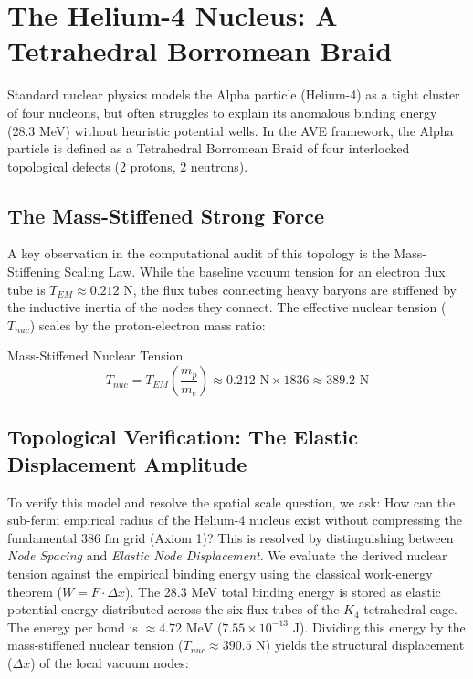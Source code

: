 \section{The Helium-4 Nucleus: A Tetrahedral Borromean Braid}

Standard nuclear physics models the Alpha particle (Helium-4) as a tight cluster of four nucleons, but often struggles to explain its anomalous binding energy (28.3 MeV) without heuristic potential wells. In the AVE framework, the Alpha particle is defined as a Tetrahedral Borromean Braid of four interlocked topological defects (2 protons, 2 neutrons).

\subsection{The Mass-Stiffened Strong Force}

A key observation in the computational audit of this topology is the Mass-Stiffening Scaling Law. While the baseline vacuum tension for an electron flux tube is $T_{EM}\approx0.212\text{ N}$, the flux tubes connecting heavy baryons are stiffened by the inductive inertia of the nodes they connect. The effective nuclear tension ($T_{nuc}$) scales by the proton-electron mass ratio:

\begin{resultbox}{Mass-Stiffened Nuclear Tension}
\begin{equation}
    T_{nuc} = T_{EM}\left(\frac{m_p}{m_e}\right) \approx 0.212\text{ N} \times 1836 \approx 389.2\text{ N}
\end{equation}
\end{resultbox}

\subsection{Topological Verification: The Elastic Displacement Amplitude}

To verify this model and resolve the spatial scale question, we ask: How can the sub-fermi empirical radius of the Helium-4 nucleus exist without compressing the fundamental $386\text{ fm}$ grid (Axiom 1)? This is resolved by distinguishing between \textit{Node Spacing} and \textit{Elastic Node Displacement}. We evaluate the derived nuclear tension against the empirical binding energy using the classical work-energy theorem ($W = F \cdot \Delta x$). The 28.3 MeV total binding energy is stored as elastic potential energy distributed across the six flux tubes of the $K_{4}$ tetrahedral cage. The energy per bond is $\approx 4.72\text{ MeV}$ ($7.55 \times 10^{-13}\text{ J}$). Dividing this energy by the mass-stiffened nuclear tension ($T_{nuc} \approx 390.5\text{ N}$) yields the structural displacement ($\Delta x$) of the local vacuum nodes:

